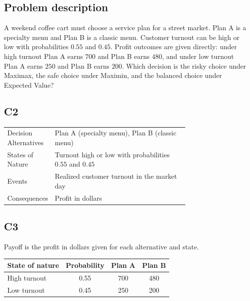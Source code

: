 

	
	\begin{ExamProblems}
		\item
		\subsection*{Problem description}
		A weekend coffee cart must choose a service plan for a street market. Plan A is a specialty menu and Plan B is a classic menu. Customer turnout can be high or low with probabilities $0.55$ and $0.45$. Profit outcomes are given directly: under high turnout Plan A earns $700$ and Plan B earns $480$, and under low turnout Plan A earns $250$ and Plan B earns $200$. Which decision is the risky choice under Maximax, the safe choice under Maximin, and the balanced choice under Expected Value?

		\subsection*{C2}
		\begin{center}
			\begin{tabular}{l p{0.74\linewidth}}
				\toprule
				Decision Alternatives & Plan A (specialty menu), Plan B (classic menu) \\
				States of Nature & Turnout high or low with probabilities $0.55$ and $0.45$ \\
				Events & Realized customer turnout in the market day \\
				Consequences & Profit in dollars \\
				\bottomrule
			\end{tabular}
		\end{center}

		\subsection*{C3}
		Payoff is the profit in dollars given for each alternative and state.
		\begin{center}
			\begin{tabular}{l c c c}
				\toprule
				State of nature & Probability & Plan A & Plan B \\
				\midrule
				High turnout & 0.55 & 700 & 480 \\
				Low turnout & 0.45 & 250 & 200 \\
				\bottomrule
		\end{tabular}
		\end{center}


\end{ExamProblems}
